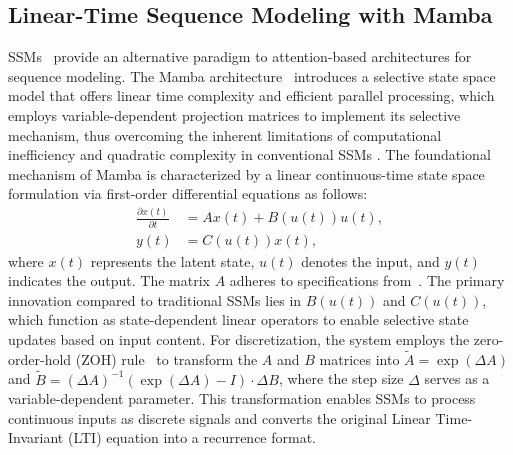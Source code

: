 \subsection{Linear-Time Sequence Modeling with Mamba}
\vspace{-0.5em}
SSMs~\cite{gu2022efficiently} provide an alternative paradigm to attention-based architectures for sequence modeling. The Mamba architecture~\cite{gu2024mamba} introduces a selective state space model that offers linear time complexity and efficient parallel processing, which employs variable-dependent projection matrices to implement its selective mechanism, thus overcoming the inherent limitations of computational inefficiency and quadratic complexity in conventional SSMs \cite{hippo, gu2022efficiently, smith2023simplified, gu2024mamba}. The foundational mechanism of Mamba is characterized by a linear continuous-time state space formulation via first-order differential equations as follows:
\begin{equation}
\begin{aligned}
\frac{\partial x(t)}{\partial t} &= Ax(t) + B(u(t))u(t),\\
y(t) &= C(u(t))x(t),
\end{aligned}
\end{equation}
where $x(t)$ represents the latent state, $u(t)$ denotes the input, and $y(t)$ indicates the output. The matrix $A$ adheres to specifications from~\cite{gu2022parameterizationinitializationdiagonalstate}. The primary innovation compared to traditional SSMs lies in $B(u(t))$ and $C(u(t))$, which function as state-dependent linear operators to enable selective state updates based on input content. For discretization, the system employs the zero-order-hold (ZOH) rule~\cite{yang2018improvingclosedlooptrackingperformance} to transform the $A$ and $B$ matrices into $\tilde{A} = \exp(\Delta A)$ and $\tilde{B} = (\Delta A)^{-1}(\exp(\Delta A) - I) \cdot \Delta B$, where the step size $\Delta$ serves as a variable-dependent parameter. This transformation enables SSMs to process continuous inputs as discrete signals and converts the original Linear Time-Invariant (LTI) equation into a recurrence format.

